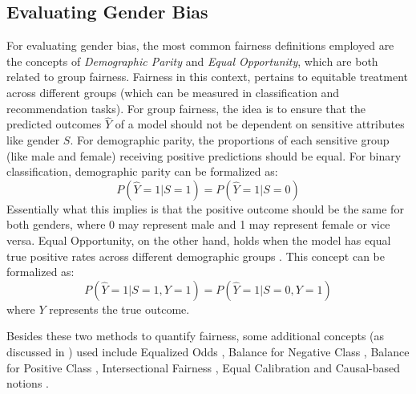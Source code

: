 \subsection{Evaluating Gender Bias}
\label{subsec:fair_notion}
For evaluating gender bias, the most common fairness definitions employed are the concepts of \textit{Demographic Parity} and \textit{Equal Opportunity}, which are both related to group fairness. Fairness in this context, pertains to equitable treatment across different groups (which can be measured in classification and recommendation tasks).
For group fairness, the idea is to ensure that the predicted outcomes  \(\hat{Y}\) of a model should not be dependent on sensitive attributes like gender $S$. 
For demographic parity, the proportions of each sensitive group (like male and female) receiving positive predictions should be equal. 
For binary classification, demographic parity can be formalized as: 
\[P(\hat{Y}=1 | S=1) = P(\hat{Y}=1 | S=0)\] 
Essentially what this implies is that the positive outcome should be the same for both genders, where 0 may represent male and 1 may represent female or vice versa. 
Equal Opportunity, on the other hand, holds when the model has equal true positive rates across different demographic groups \cite{hardt16}. 
This concept can be formalized as:
\[P(\hat{Y}=1 | S=1, Y=1) = P(\hat{Y}=1 | S=0, Y=1) \]
where \(Y\) represents the true outcome.

Besides these two methods to quantify fairness, some additional concepts (as discussed in \cite{kheya2024pursuitfairnessartificialintelligence}) used include Equalized Odds \cite{hardt16}, Balance for Negative Class \cite{10.1145/3194770.3194776}, Balance for Positive Class \cite{10.1145/3194770.3194776}, Intersectional Fairness \cite{Gohar2023ASO}, Equal Calibration \cite{Chouldechova2016FairPW}
and Causal-based notions \cite{10.5555/3294996.3295162, Acharyya_Das_Chattoraj_Tanveer_2020}. 



